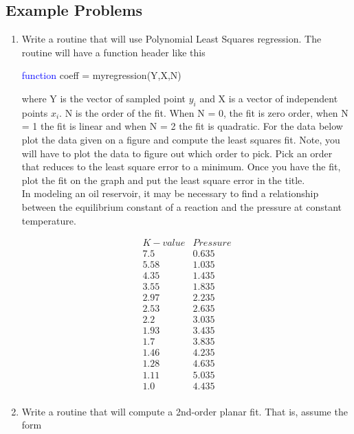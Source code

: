 \subsection{Example Problems}

\begin{enumerate}

\item Write a routine that will use Polynomial Least Squares regression. The
routine will have a function header like this
\begin{framed}
\textcolor{blue}{function} coeff = myregression(Y,X,N)
\end{framed}
\noindent where Y is the vector of sampled point $y_i$ and X is a vector of
independent points $x_i$. N is the order of the fit. When N = 0, the
fit is zero order, when N = 1 the fit is linear and when N = 2 the fit
is quadratic. For the data below plot the data given on a figure and
compute the least squares fit. Note, you will have to plot the data to
figure out which order to pick. Pick an order that reduces to the
least square error to a minimum. Once you have the fit, plot the fit on
the graph and put the least square error in the title. 
\ \\

In modeling an oil reservoir, it may be necessary to find a
relationship between the equilibrium constant of a reaction and the
pressure at constant temperature. 

\begin{equation}\nonumber
\begin{matrix}
K-value & Pressure \\
7.5 & 0.635\\
5.58 & 1.035\\
4.35 & 1.435\\
3.55 & 1.835\\
2.97 & 2.235\\
2.53 & 2.635\\
2.2 & 3.035\\
1.93 & 3.435\\
1.7 & 3.835\\
1.46 & 4.235\\
1.28 & 4.635\\
1.11 & 5.035\\
1.0 & 4.435\\
\end{matrix}
\end{equation}

\item Write a routine that will compute a 2nd-order planar fit. That
  is, assume the form


\end{enumerate}
